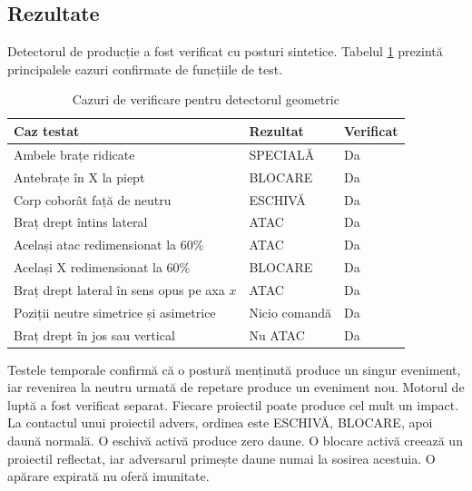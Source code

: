 \documentclass[12pt, a4paper]{article}
\begin{document}
\subsection{Rezultate}

Detectorul de producție a fost verificat cu posturi sintetice. Tabelul
\ref{tab:gesturi} prezintă principalele cazuri confirmate de funcțiile de test.

\begin{table}[H]
    \centering
    \caption{Cazuri de verificare pentru detectorul geometric}
    \label{tab:gesturi}
    \begin{tabular}{p{}p{}p{}}
        \toprule
        \textbf{Caz testat} & \textbf{Rezultat} & \textbf{Verificat} \\
        \midrule
        Ambele brațe ridicate & SPECIALĂ & Da \\
        Antebrațe în X la piept & BLOCARE & Da \\
        Corp coborât față de neutru & ESCHIVĂ & Da \\
        Braț drept întins lateral & ATAC & Da \\
        Același atac redimensionat la 60\% & ATAC & Da \\
        Același X redimensionat la 60\% & BLOCARE & Da \\
        Braț drept lateral în sens opus pe axa $x$ & ATAC & Da \\
        Poziții neutre simetrice și asimetrice & Nicio comandă & Da \\
        Braț drept în jos sau vertical & Nu ATAC & Da \\
        \bottomrule
    \end{tabular}
\end{table}

Testele temporale confirmă că o postură menținută produce un singur eveniment, iar
revenirea la neutru urmată de repetare produce un eveniment nou. Motorul de luptă a
fost verificat separat. Fiecare proiectil poate produce cel mult un impact. La
contactul unui proiectil advers, ordinea este ESCHIVĂ, BLOCARE, apoi daună normală.
O eschivă activă produce zero daune. O blocare activă creează un proiectil reflectat,
iar adversarul primește daune numai la sosirea acestuia. O apărare expirată nu oferă
imunitate.
\end{document}
